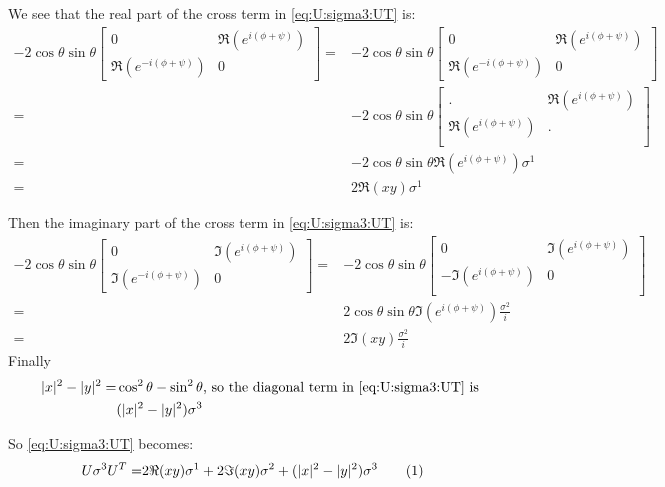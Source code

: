 \documentclass[]{article}
\newcommand\numberthis{\addtocounter{equation}{1}\tag{\theequation}}
\begin{document}
We see that the real part of the cross term in \eqref{eq:U:sigma3:UT} is:
\begin{align*}
	-2 \cos{\theta}\sin{\theta}\begin{bmatrix}
		0&\Re({e^{i(\phi + \psi)}})\\
		\Re({e^{-i(\phi + \psi)}})&0
	\end{bmatrix}=&	-2 \cos{\theta}\sin{\theta} \begin{bmatrix}
		0&\Re({e^{i(\phi + \psi)}})\\
		\Re({e^{-i(\phi + \psi)}})&0
	\end{bmatrix}\\
	=&	-2 \cos{\theta}\sin{\theta} \begin{bmatrix}
		.&\Re({e^{i(\phi + \psi)}})\\
		\Re({e^{i(\phi + \psi)}})&.\\
	\end{bmatrix} \\
	=& -2 \cos{\theta}\sin{\theta} \Re({e^{i(\phi + \psi)}}) \sigma^1\\
	=& 2 \Re(xy) \sigma^1
\end{align*}

Then the imaginary part of the cross term in \eqref{eq:U:sigma3:UT} is:
\begin{align*}
	-2 \cos{\theta}\sin{\theta}\begin{bmatrix}
		0&\Im({e^{i(\phi + \psi)}})\\
		\Im({e^{-i(\phi + \psi)}})&0
	\end{bmatrix}=&	-2 \cos{\theta}\sin{\theta} \begin{bmatrix}
		0&\Im({e^{i(\phi + \psi)}})\\
		-\Im({e^{i(\phi + \psi)}})&0\\
	\end{bmatrix} \\
	=& 2 \cos{\theta}\sin{\theta} \Im({e^{i(\phi + \psi)}}) \frac{\sigma^2}{i}\\
	=& 2 \Im(xy) \frac{\sigma^2}{i}
\end{align*}
Finally
\begin{align*}
	\vert x \vert^2 - \vert y \vert^2 =& \cos^2 \theta - \sin^2 \theta \text{, so the diagonal term in \eqref{eq:U:sigma3:UT} is}\\
	&(\vert x \vert^2 - \vert y \vert^2) \sigma^3
\end{align*}

So \eqref{eq:U:sigma3:UT} becomes:
\begin{align*}
		U \sigma^3 U^T =&  2 \Re(xy) \sigma^1 + 2 \Im(xy) \sigma^2 + (\vert x \vert^2 - \vert y \vert^2) \sigma^3 \numberthis \label{eq:U:sigma3:expanded}
\end{align*}
\end{document}
